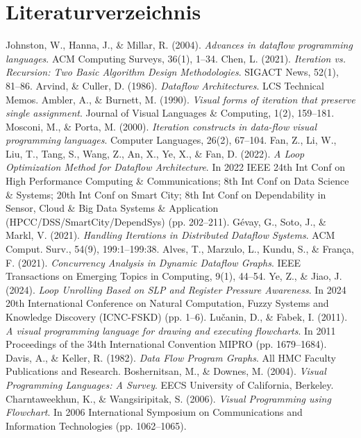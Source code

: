     \chapter{Literaturverzeichnis}
    \begin{thebibliography}{9}
        Johnston, W., Hanna, J., \& Millar, R. (2004). \emph{Advances in dataflow programming languages}. ACM Computing Surveys, 36(1), 1–34.
        Chen, L. (2021). \emph{Iteration vs. Recursion: Two Basic Algorithm Design Methodologies}. SIGACT News, 52(1), 81–86.
        Arvind, \& Culler, D. (1986). \emph{Dataflow Architectures}. LCS Technical Memos.
        Ambler, A., \& Burnett, M. (1990). \emph{Visual forms of iteration that preserve single assignment}. Journal of Visual Languages \& Computing, 1(2), 159–181.
        Mosconi, M., \& Porta, M. (2000). \emph{Iteration constructs in data-flow visual programming languages}. Computer Languages, 26(2), 67–104.
        Fan, Z., Li, W., Liu, T., Tang, S., Wang, Z., An, X., Ye, X., \& Fan, D. (2022). \emph{A Loop Optimization Method for Dataflow Architecture}. In 2022 IEEE 24th Int Conf on High Performance Computing \& Communications; 8th Int Conf on Data Science \& Systems; 20th Int Conf on Smart City; 8th Int Conf on Dependability in Sensor, Cloud \& Big Data Systems \& Application (HPCC/DSS/SmartCity/DependSys) (pp. 202–211).
        Gévay, G., Soto, J., \& Markl, V. (2021). \emph{Handling Iterations in Distributed Dataflow Systems}. ACM Comput. Surv., 54(9), 199:1–199:38.
        Alves, T., Marzulo, L., Kundu, S., \& França, F. (2021). \emph{Concurrency Analysis in Dynamic Dataflow Graphs}. IEEE Transactions on Emerging Topics in Computing, 9(1), 44–54.
        Ye, Z., \& Jiao, J. (2024). \emph{Loop Unrolling Based on SLP and Register Pressure Awareness}. In 2024 20th International Conference on Natural Computation, Fuzzy Systems and Knowledge Discovery (ICNC-FSKD) (pp. 1–6).
        Lučanin, D., \& Fabek, I. (2011). \emph{A visual programming language for drawing and executing flowcharts}. In 2011 Proceedings of the 34th International Convention MIPRO (pp. 1679–1684).
        Davis, A., \& Keller, R. (1982). \emph{Data Flow Program Graphs}. All HMC Faculty Publications and Research.
        Boshernitsan, M., \& Downes, M. (2004). \emph{Visual Programming Languages: A Survey}. EECS University of California, Berkeley.
        Charntaweekhun, K., \& Wangsiripitak, S. (2006). \emph{Visual Programming using Flowchart}. In 2006 International Symposium on Communications and Information Technologies (pp. 1062–1065).

\end{thebibliography}

